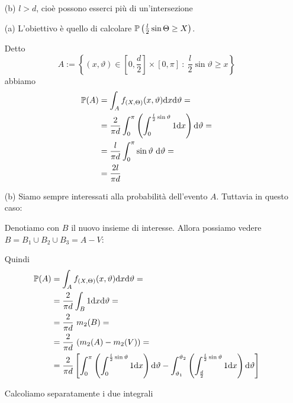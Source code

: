 \begin{enumerate}
\begin{enumerate}
\item [(b)] $l>d$, cioè possono esserci più di un'intersezione

\end{enumerate}

\medskip

\begin{enumerate}

\item [(a)] L'obiettivo è quello di calcolare $\mathbb{P}\left(\frac{l}{2}\sin\Theta\geq X\right)$.

Detto 
\[
A:=\left\{(x,\vartheta)\in \left[0,\frac{d}{2}\right]\times \left[0,\pi\right]\ :\ \frac{l}{2}\sin\vartheta\geq x  \right\}
\]
abbiamo
\begin{gather*}
\begin{aligned}
\mathbb{P}(A)&=\int_A f_{(X,\Theta)}(x,\vartheta)\mathrm{d} x\text{d}\vartheta=\\
&=\frac{2}{\pi d}\int_0^\pi \left(\int_0^{\frac{l}{2}\sin\vartheta}1\mathrm{d} x   \right)\text{d}\vartheta=\\
&=\frac{l}{\pi d}\int_0^\pi \sin\vartheta\text{ d}\vartheta=\\
&=\frac{2l}{\pi d}
\end{aligned}
\end{gather*}

\item [(b)] Siamo sempre interessati alla probabilità dell'evento $A$. Tuttavia in questo caso:

Denotiamo con $B$ il nuovo insieme di interesse. Allora possiamo vedere $B=B_1\cup B_2\cup B_3=A-V$:

Quindi
\begin{gather}
\begin{aligned}
\label{eqn_7_8}
\mathbb{P}(A)&=\int_A f_{(X,\Theta)}(x,\vartheta)\mathrm{d} x\text{d}\vartheta=\\
&=\frac{2}{\pi d}\int_B 1\mathrm{d} x\text{d}\vartheta=\\
&=\frac{2}{\pi d}\ m_2(B)=\\
&=\frac{2}{\pi d}\ (m_2(A)-m_2(V))=\\
&=\frac{2}{\pi d}\left[\int_0^\pi \left(\int_0^{\frac{l}{2}\sin\vartheta}1\mathrm{d} x \right)\text{d}\vartheta - \int_{\vartheta_1}^{\vartheta_2} \left(\int_{\frac{d}{2}}^{\frac{l}{2}\sin\vartheta}1\mathrm{d} x \right)\text{d}\vartheta  \right]
\end{aligned}
\end{gather}

Calcoliamo separatamente i due integrali


\end{enumerate}
\end{enumerate}
